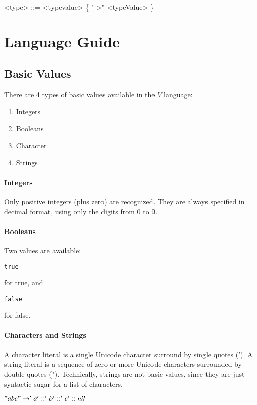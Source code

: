 \documentclass{article}
\def\code#1{\begin{footnotesize}\texttt{#1}\end{footnotesize}}
\begin{document}
\begin{grammar}
  <type> ::= <typevalue> \textvisiblespace \{  "->" <typeValue> \textvisiblespace \}
\end{grammar}


\section{Language Guide}

\subsection{Basic Values}

There are 4 types of basic values available in the $V$ language:

\begin{enumerate}
  \item Integers
  \item Booleans
  \item Character
  \item Strings
\end{enumerate}

\paragraph{Integers}
Only positive integers (plus zero) are recognized.
They are always specified in decimal format,  using only the digits from 0 to 9.

\paragraph{Booleans}
Two values are available: \code{true} for true, and \code{false} for false.

\paragraph{Characters and Strings}
A character literal is a single Unicode character surround by single quotes (').
A string literal is a sequence of zero or more Unicode characters surrounded by double quotes (").
Technically, strings are not basic values, since they are just syntactic sugar for a list of characters.

$"abc" \rightarrow 'a' :: 'b' :: 'c' :: nil$
\end{document}

